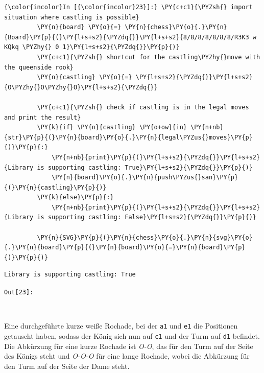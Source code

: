     \begin{Verbatim}[commandchars=\\\{\}]
{\color{incolor}In [{\color{incolor}23}]:} \PY{c+c1}{\PYZsh{} import situation where castling is possible}
         \PY{n}{board} \PY{o}{=} \PY{n}{chess}\PY{o}{.}\PY{n}{Board}\PY{p}{(}\PY{l+s+s2}{\PYZdq{}}\PY{l+s+s2}{8/8/8/8/8/8/8/R3K3 w KQkq \PYZhy{} 0 1}\PY{l+s+s2}{\PYZdq{}}\PY{p}{)}
         \PY{c+c1}{\PYZsh{} shortcut for the castling\PYZhy{}move with the queenside rook}
         \PY{n}{castling} \PY{o}{=} \PY{l+s+s2}{\PYZdq{}}\PY{l+s+s2}{O\PYZhy{}O\PYZhy{}O}\PY{l+s+s2}{\PYZdq{}}
         
         \PY{c+c1}{\PYZsh{} check if castling is in the legal moves and print the result}
         \PY{k}{if} \PY{n}{castling} \PY{o+ow}{in} \PY{n+nb}{str}\PY{p}{(}\PY{n}{board}\PY{o}{.}\PY{n}{legal\PYZus{}moves}\PY{p}{)}\PY{p}{:}
             \PY{n+nb}{print}\PY{p}{(}\PY{l+s+s2}{\PYZdq{}}\PY{l+s+s2}{Library is supporting castling: True}\PY{l+s+s2}{\PYZdq{}}\PY{p}{)}
             \PY{n}{board}\PY{o}{.}\PY{n}{push\PYZus{}san}\PY{p}{(}\PY{n}{castling}\PY{p}{)}
         \PY{k}{else}\PY{p}{:}
             \PY{n+nb}{print}\PY{p}{(}\PY{l+s+s2}{\PYZdq{}}\PY{l+s+s2}{Library is supporting castling: False}\PY{l+s+s2}{\PYZdq{}}\PY{p}{)}
         
         \PY{n}{SVG}\PY{p}{(}\PY{n}{chess}\PY{o}{.}\PY{n}{svg}\PY{o}{.}\PY{n}{board}\PY{p}{(}\PY{n}{board}\PY{o}{=}\PY{n}{board}\PY{p}{)}\PY{p}{)} 
\end{Verbatim}


    \begin{Verbatim}[commandchars=\\\{\}]
Library is supporting castling: True

    \end{Verbatim}
\texttt{\color{outcolor}Out[{\color{outcolor}23}]:}
    
    \begin{center}
    \end{center}
    { \hspace*{\fill} \\}
    

    Eine durchgeführte kurze weiße Rochade, bei der \texttt{a1} und
\texttt{e1} die Positionen getauscht haben, sodass der König sich nun
auf \texttt{c1} und der Turm auf \texttt{d1} befindet. Die Abkürzung für
eine kurze Rochade ist \emph{O-O}, das für den Turm auf der Seite des
Königs steht und \emph{O-O-O} für eine lange Rochade, wobei die
Abkürzung für den Turm auf der Seite der Dame steht.

